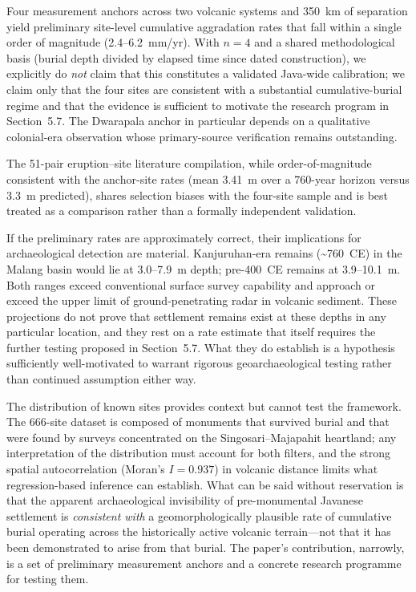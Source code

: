 \documentclass[12pt,a4paper]{article}
\begin{document}
Four measurement anchors across two volcanic systems and 350~km of separation yield preliminary site-level cumulative aggradation rates that fall within a single order of magnitude (2.4--6.2~mm/yr). With $n=4$ and a shared methodological basis (burial depth divided by elapsed time since dated construction), we explicitly do \emph{not} claim that this constitutes a validated Java-wide calibration; we claim only that the four sites are consistent with a substantial cumulative-burial regime and that the evidence is sufficient to motivate the research program in Section~5.7. The Dwarapala anchor in particular depends on a qualitative colonial-era observation whose primary-source verification remains outstanding.

The 51-pair eruption--site literature compilation, while order-of-magnitude consistent with the anchor-site rates (mean 3.41~m over a 760-year horizon versus 3.3~m predicted), shares selection biases with the four-site sample and is best treated as a comparison rather than a formally independent validation.

If the preliminary rates are approximately correct, their implications for archaeological detection are material. Kanjuruhan-era remains (\textasciitilde760~CE) in the Malang basin would lie at 3.0--7.9~m depth; pre-400~CE remains at 3.9--10.1~m. Both ranges exceed conventional surface survey capability and approach or exceed the upper limit of ground-penetrating radar in volcanic sediment. These projections do not prove that settlement remains exist at these depths in any particular location, and they rest on a rate estimate that itself requires the further testing proposed in Section~5.7. What they do establish is a hypothesis sufficiently well-motivated to warrant rigorous geoarchaeological testing rather than continued assumption either way.

The distribution of known sites provides context but cannot test the framework. The 666-site dataset is composed of monuments that survived burial and that were found by surveys concentrated on the Singosari--Majapahit heartland; any interpretation of the distribution must account for both filters, and the strong spatial autocorrelation (Moran's $I = 0.937$) in volcanic distance limits what regression-based inference can establish. What can be said without reservation is that the apparent archaeological invisibility of pre-monumental Javanese settlement is \emph{consistent with} a geomorphologically plausible rate of cumulative burial operating across the historically active volcanic terrain---not that it has been demonstrated to arise from that burial. The paper's contribution, narrowly, is a set of preliminary measurement anchors and a concrete research programme for testing them.
\end{document}
